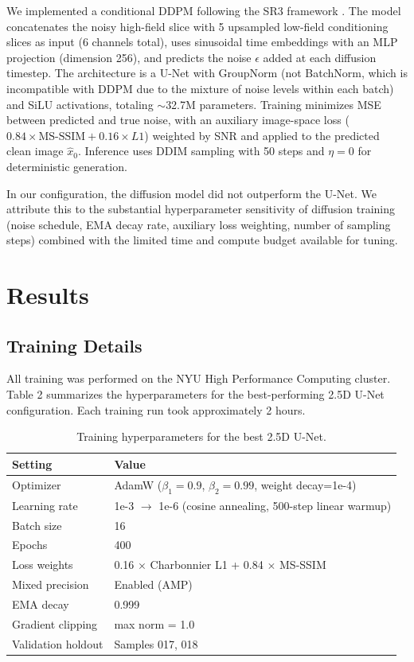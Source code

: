 \documentclass[a4paper,11pt]{article}
\begin{document}
We implemented a conditional DDPM following the SR3 framework \cite{saharia2022image}. The model concatenates the noisy high-field slice with 5 upsampled low-field conditioning slices as input (6 channels total), uses sinusoidal time embeddings with an MLP projection (dimension 256), and predicts the noise $\epsilon$ added at each diffusion timestep. The architecture is a U-Net with GroupNorm (not BatchNorm, which is incompatible with DDPM due to the mixture of noise levels within each batch) and SiLU activations, totaling $\sim$32.7M parameters. Training minimizes MSE between predicted and true noise, with an auxiliary image-space loss ($0.84 \times \text{MS-SSIM} + 0.16 \times L1$) weighted by SNR and applied to the predicted clean image $\hat{x}_0$. Inference uses DDIM sampling with 50 steps and $\eta = 0$ for deterministic generation.

In our configuration, the diffusion model did not outperform the U-Net. We attribute this to the substantial hyperparameter sensitivity of diffusion training (noise schedule, EMA decay rate, auxiliary loss weighting, number of sampling steps) combined with the limited time and compute budget available for tuning. 

\section{Results} 

\subsection{Training Details}
All training was performed on the NYU High Performance Computing cluster. Table 2 summarizes the hyperparameters for the best-performing 2.5D U-Net configuration. Each training run took approximately 2 hours.

\begin{table}[H]
\centering
\caption{Training hyperparameters for the best 2.5D U-Net.}
\begin{tabular}{ll}
\toprule
\textbf{Setting} & \textbf{Value} \\
\midrule
Optimizer & AdamW ($\beta_1=0.9$, $\beta_2=0.99$, weight decay=1e-4) \\
Learning rate & 1e-3 $\rightarrow$ 1e-6 (cosine annealing, 500-step linear warmup) \\
Batch size & 16 \\
Epochs & 400 \\
Loss weights & 0.16 $\times$ Charbonnier L1 + 0.84 $\times$ MS-SSIM \\
Mixed precision & Enabled (AMP) \\
EMA decay & 0.999 \\
Gradient clipping & max norm = 1.0 \\
Validation holdout & Samples 017, 018 \\
\bottomrule
\end{tabular}
\end{table}
\end{document}
